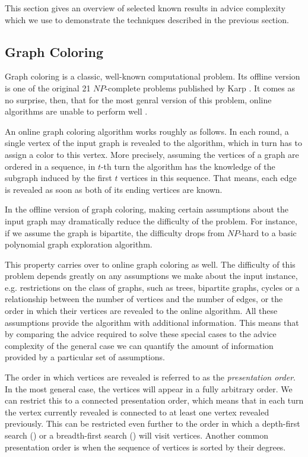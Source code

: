 This section gives an overview of selected known results in advice
complexity which we use to demonstrate the techniques described in the
previous section.

\subsection{Graph Coloring}
Graph coloring is a classic, well-known computational problem. Its offline
version is one of the original 21 $NP$-complete problems published by Karp
\cite{karp-np}. It comes as no surprise, then, that for the most genral
version of this problem, online algorithms are unable to perform well
\cite{online-graph-bound}.

An online graph coloring algorithm works roughly as follows. In each
round, a single vertex of the input graph is revealed to the algorithm,
which in turn has to assign a color to this vertex. More precisely,
assuming the vertices of a graph are ordered in a sequence, in $t$-th turn
the algorithm has the knowledge of the subgraph induced by the first $t$
vertices in this sequence. That means, each edge is revealed as soon as
both of its ending vertices are known.

In the offline version of graph coloring, making certain assumptions about
the input graph may dramatically reduce the difficulty of the problem. For
instance, if we assume the graph is bipartite, the difficulty drops from
$NP$-hard to a basic polynomial graph exploration algorithm.

This property carries over to online graph coloring as well. The
difficulty of this problem depends greatly on any assumptions we make
about the input instance, e.g. restrictions on the class of graphs, such
as trees, bipartite graphs, cycles or a relationship between the number of
vertices and the number of edges, or the order in which their vertices are
revealed to the online algorithm. All these assumptions provide the
algorithm with additional information. This means that by comparing the
advice required to solve these special cases to the advice complexity of
the general case we can quantify the amount of information provided by a
particular set of assumptions.

The order in which vertices are revealed is referred to as the
\emph{presentation order}. In the most general case, the vertices will
appear in a fully arbitrary order. We can restrict this to a connected
presentation order, which means that in each turn the vertex currently
revealed is connected to at least one vertex revealed previously. This can
be restricted even further to the order in which a depth-first search
() or a breadth-first search () will visit
vertices. Another common presentation order is when the sequence of
vertices is sorted by their degrees.

